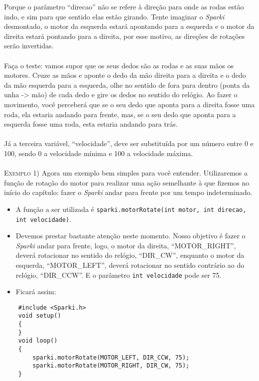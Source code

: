 Porque o parâmetro ``direcao'' não se refere à direção para onde as rodas estão indo, e sim para que sentido elas estão girando. Tente imaginar o \textsl{Sparki} desmontado, o motor da esquerda estará apontando para a esquerda e o motor da direita estará pontando para a direita, por esse motivo, as direções de rotações serão invertidas. 
\paragraph{}
Faça o teste: vamos supor que os seus dedos são as rodas e as suas mãos os motores. Cruze as mãos e aponte o dedo da mão direita para a direita e o dedo da mão esquerda para a esquerda, olhe no sentido de fora para dentro (ponta da unha -> mão) de cada dedo e gire os dedos no sentido do relógio. Ao fazer o movimento, você perceberá que se o seu dedo que aponta para a direita fosse uma roda, ela estaria andando para frente, mas, se o seu dedo que aponta para a esquerda fosse uma roda, esta estaria andando para trás.
\paragraph{}
Já a terceira variável, ``velocidade'', deve ser substituída por um número entre 0 e 100, sendo 0 a velocidade mínima e 100 a velocidade máxima.
\\~\\
\textsc{Exemplo 1)} Agora um exemplo bem simples para você entender. Utilizaremos a função de rotação do motor para realizar uma ação semelhante à que fizemos no início do capítulo: fazer o \textsl{Sparki} andar para frente por um tempo indeterminado.
        
\begin{itemize}
    \item A função a ser utilizada é \texttt{sparki.motorRotate(int motor, int direcao, int velocidade)}.
    \item Devemos prestar bastante atenção neste momento. Nosso objetivo é fazer o \textsl{Sparki} andar para frente, logo, o motor da direita, ``MOTOR\_RIGHT'', deverá rotacionar no sentido do relógio, ``DIR\_CW'', enquanto o motor da esquerda, ``MOTOR\_LEFT'', deverá rotacionar no sentido contrário ao do relógio, ``DIR\_CCW''. E o parâmetro \texttt{int velocidade} pode ser 75.
    \item Ficará assim:
\end{itemize}
    
\begin{verbatim}
    #include <Sparki.h>
    void setup()
    {
    }
    void loop()
    {
        sparki.motorRotate(MOTOR_LEFT, DIR_CCW, 75);
        sparki.motorRotate(MOTOR_RIGHT, DIR_CW, 75);
    }
\end{verbatim}

